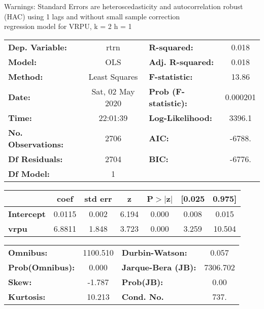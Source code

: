 Warnings: \newline
 [1] Standard Errors are heteroscedasticity and autocorrelation robust (HAC) using 1 lags and without small sample correction\\ 

regression model for VRPU, k = 2 h = 1\begin{center}
\begin{tabular}{lclc}
\toprule
\textbf{Dep. Variable:}    &       rtrn       & \textbf{  R-squared:         } &     0.018   \\
\textbf{Model:}            &       OLS        & \textbf{  Adj. R-squared:    } &     0.018   \\
\textbf{Method:}           &  Least Squares   & \textbf{  F-statistic:       } &     13.86   \\
\textbf{Date:}             & Sat, 02 May 2020 & \textbf{  Prob (F-statistic):} &  0.000201   \\
\textbf{Time:}             &     22:01:39     & \textbf{  Log-Likelihood:    } &    3396.1   \\
\textbf{No. Observations:} &        2706      & \textbf{  AIC:               } &    -6788.   \\
\textbf{Df Residuals:}     &        2704      & \textbf{  BIC:               } &    -6776.   \\
\textbf{Df Model:}         &           1      & \textbf{                     } &             \\
\bottomrule
\end{tabular}
\begin{tabular}{lcccccc}
                   & \textbf{coef} & \textbf{std err} & \textbf{z} & \textbf{P$> |$z$|$} & \textbf{[0.025} & \textbf{0.975]}  \\
\midrule
\textbf{Intercept} &       0.0115  &        0.002     &     6.194  &         0.000        &        0.008    &        0.015     \\
\textbf{vrpu}      &       6.8811  &        1.848     &     3.723  &         0.000        &        3.259    &       10.504     \\
\bottomrule
\end{tabular}
\begin{tabular}{lclc}
\textbf{Omnibus:}       & 1100.510 & \textbf{  Durbin-Watson:     } &    0.057  \\
\textbf{Prob(Omnibus):} &   0.000  & \textbf{  Jarque-Bera (JB):  } & 7306.702  \\
\textbf{Skew:}          &  -1.787  & \textbf{  Prob(JB):          } &     0.00  \\
\textbf{Kurtosis:}      &  10.213  & \textbf{  Cond. No.          } &     737.  \\
\bottomrule
\end{tabular}
\end{center}

